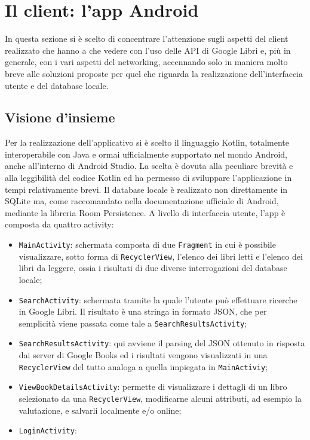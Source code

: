 \documentclass[a4paper]{article}
\def\code#1{\texttt{#1}}
\begin{document}
\section{Il client: l'app Android}
In questa sezione si è scelto di concentrare l'attenzione sugli aspetti del client realizzato che hanno a che vedere con l'uso delle API di Google Libri e, più in generale, con i vari aspetti del networking, accennando solo in maniera molto breve alle soluzioni proposte per quel che riguarda la realizzazione dell'interfaccia utente e del database locale.
	\subsection{Visione d'insieme}
	Per la realizzazione dell'applicativo si è scelto il linguaggio Kotlin, totalmente interoperabile con Java e ormai ufficialmente supportato nel mondo Android, anche all'interno di Android Studio. La scelta è dovuta alla peculiare brevità e alla leggibilità del codice Kotlin ed ha permesso di sviluppare l'applicazione in tempi relativamente brevi.\newline
	Il database locale è realizzato non direttamente in SQLite ma, come raccomandato nella documentazione ufficiale di Android, mediante la libreria Room Persistence.
	A livello di interfaccia utente, l'app è composta da quattro activity:
	\begin{itemize}
		\item \code{MainActivity}: schermata composta di due \code{Fragment} in cui è possibile visualizzare, sotto forma di \code{RecyclerView}, l'elenco dei libri letti e l'elenco dei libri da leggere, ossia i risultati di due diverse interrogazioni del database locale;
		\item \code{SearchActivity}: schermata tramite la quale l'utente può effettuare ricerche in Google Libri. Il risultato è una stringa in formato JSON, che per semplicità viene passata come tale a \code{SearchResultsActivity};
		\item \code{SearchResultsActivity}: qui avviene il parsing del JSON ottenuto in risposta dai server di Google Books ed i risultati vengono visualizzati in una \code{RecyclerView} del tutto analoga a quella impiegata in \code{MainActiviy};
		\item \code{ViewBookDetailsActivity}: permette di visualizzare i dettagli di un libro selezionato da una \code{RecyclerView}, modificarne alcuni attributi, ad esempio la valutazione, e salvarli localmente e/o online;
		\item \code{LoginActivity}: %
	\end{itemize}
\end{document}
